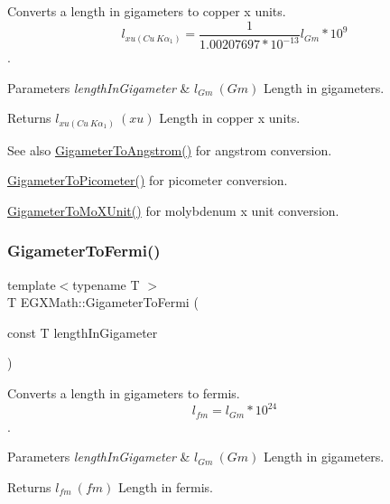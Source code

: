 Converts a length in gigameters to copper x units. \[ l_{xu(Cu\ K\alpha_1)}= \frac{1}{1.00207697*10^{-13}} l_{Gm} * 10^{9}\]. 


\begin{DoxyParams}{Parameters}
{\em length\+In\+Gigameter} & $ l_{Gm}\ (Gm)$ Length in gigameters. \\
\hline
\end{DoxyParams}
\begin{DoxyReturn}{Returns}
$ l_{xu(Cu\ K\alpha_1)}\ (xu)$ Length in copper x units. 
\end{DoxyReturn}
\begin{DoxySeeAlso}{See also}
\mbox{\hyperlink{group___e_g_x_math-_conversions-_length_conversions-_s_i-_gigameter-_non-_s_i_ga622e85e3f663039f3802b29d25655989}{Gigameter\+To\+Angstrom()}} for angstrom conversion. 

\mbox{\hyperlink{group___e_g_x_math-_conversions-_length_conversions-_s_i-_gigameter-_s_i_gae9cea35a0ce747d02ec8b6cf7bfeaa7e}{Gigameter\+To\+Picometer()}} for picometer conversion. 

\mbox{\hyperlink{group___e_g_x_math-_conversions-_length_conversions-_s_i-_gigameter-_non-_s_i_gac30ae06633de77b05d859ffb3cd2a577}{Gigameter\+To\+Mo\+X\+Unit()}} for molybdenum x unit conversion. 
\end{DoxySeeAlso}
\mbox{\label{group___e_g_x_math-_conversions-_length_conversions-_s_i-_gigameter-_non-_s_i_gadf6d730ad6e47bc8be214f3ef59b48ca}} 
\subsubsection{\texorpdfstring{Gigameter\+To\+Fermi()}{GigameterToFermi()}}
{\footnotesize\ttfamily template$<$typename T $>$ \\
T E\+G\+X\+Math\+::\+Gigameter\+To\+Fermi (\begin{DoxyParamCaption}\item[{const T}]{length\+In\+Gigameter }\end{DoxyParamCaption})}



Converts a length in gigameters to fermis. \[ l_{fm}=l_{Gm} * 10^{24} \]. 


\begin{DoxyParams}{Parameters}
{\em length\+In\+Gigameter} & $ l_{Gm}\ (Gm)$ Length in gigameters. \\
\hline
\end{DoxyParams}
\begin{DoxyReturn}{Returns}
$ l_{fm}\ (fm)$ Length in fermis. 
\end{DoxyReturn}
\mbox{\label{group___e_g_x_math-_conversions-_length_conversions-_s_i-_gigameter-_non-_s_i_ga90426d22455e96b1f61e1850c7b89f77}} 
